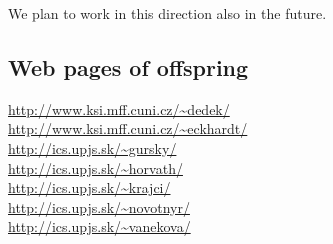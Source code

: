      We plan to work in this direction also in the future. 

\nocite{1}
\nocite{2}
\nocite{3}
\nocite{4}
\nocite{5}
\nocite{6}
\nocite{7}
\nocite{8}
\nocite{9}
\nocite{10}

\nocite{11}
\nocite{12}
\nocite{13}
\nocite{14}
\nocite{15}
\nocite{16}
\nocite{17}
\nocite{18}
\nocite{19}
\nocite{20}

\nocite{21}
\nocite{22}
\nocite{23}
\nocite{24}
\nocite{25}
\nocite{26}
\nocite{27}
\nocite{28}
\nocite{29}
\nocite{30}

\nocite{31}
\nocite{32}
\nocite{33}
\nocite{34}
\nocite{35}
\nocite{36}
\nocite{37}
\nocite{38}
\nocite{39}
\nocite{40}

\nocite{41}
\nocite{42}
\nocite{43}
\nocite{44}
\nocite{45}
\nocite{46}
\nocite{47}





\subsection*{Web pages of offspring}

{\small
\noindent\url{http://www.ksi.mff.cuni.cz/~dedek/}
\\\url{http://www.ksi.mff.cuni.cz/~eckhardt/}
\\\url{http://ics.upjs.sk/~gursky/} 
\\\url{http://ics.upjs.sk/~horvath/} 
\\\url{http://ics.upjs.sk/~krajci/}
\\\url{http://ics.upjs.sk/~novotnyr/}
\\\url{http://ics.upjs.sk/~vanekova/}
}

